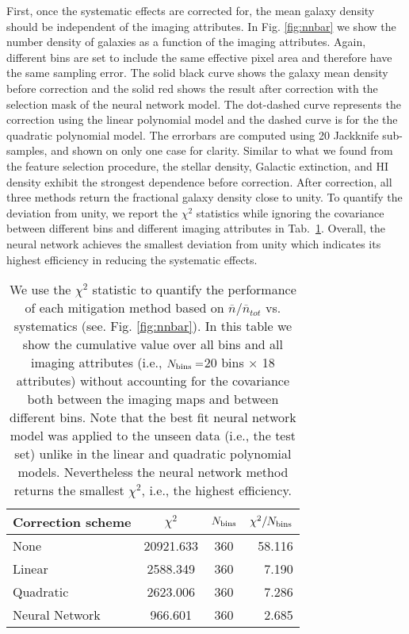 \documentclass[fleqn, usenatbib]{mnras}
\begin{document}
First, once the systematic effects are corrected for, the mean galaxy density should be independent of the imaging attributes. In Fig. \ref{fig:nnbar} we show the number density of galaxies as a function of the imaging attributes. Again, different bins are set to include the same effective pixel area and therefore have the same sampling error. The solid black curve shows the galaxy mean density before correction and the solid red shows the result after correction with the selection mask of the neural network model. The dot-dashed curve represents the correction using the linear polynomial model and the dashed curve is for the the quadratic polynomial model. The errorbars are computed using 20 Jackknife sub-samples, and shown on only one case for clarity. Similar to what we found from the feature selection procedure, the stellar density, Galactic extinction, and HI density exhibit the strongest dependence before correction. After correction, all three methods return the fractional galaxy density close to unity. To quantify the deviation from unity, we report the $\chi^{2}$ statistics while ignoring the covariance between different bins and different imaging attributes in Tab.~\ref{tab:chi2}. Overall, the neural network achieves the smallest deviation from unity which indicates its highest efficiency in reducing the systematic effects.\\

\begin{table}
	\centering
	\caption{We use the $\chi^{2}$ statistic to quantify the performance of each mitigation method based on $\overline{n}/\overline{n}_{tot}$ vs. systematics (see. Fig. \ref{fig:nnbar}). In this table we show the cumulative value over all bins and all imaging attributes (i.e., $N_{\rm bins}=$20 bins $\times$ 18 attributes) without accounting for the covariance both between the imaging maps and between different bins. Note that the best fit neural network model was applied to the unseen data (i.e., the test set) unlike in the linear and quadratic polynomial models. Nevertheless the neural network method returns the smallest $\chi^{2}$, i.e., the highest efficiency.}
	\label{tab:chi2}
	\begin{tabular}{lccr} %
	    \hline
		\hline
		Correction scheme & $\chi^{2}$ & $N_{\rm bins}$ & $\chi^{2}/N_{\rm bins}$ \\
		\hline
		None & 20921.633 & 360 & 58.116\\
		Linear & 2588.349 & 360 & 7.190\\
		Quadratic & 2623.006 & 360 & 7.286 \\
		Neural Network & 966.601 & 360 & 2.685\\
		\hline
		\hline
	\end{tabular}
\end{table}
\end{document}
